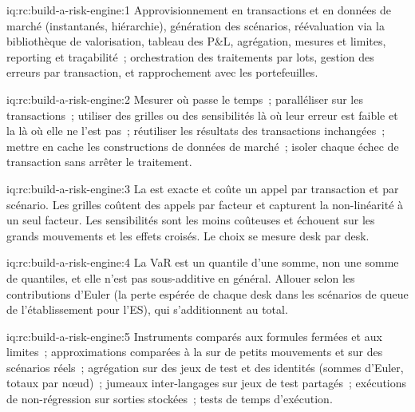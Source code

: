 \begin{solution}{iq:rc:build-a-risk-engine:1}
Approvisionnement en transactions et en données de marché (instantanés, hiérarchie), génération des scénarios, réévaluation via la
bibliothèque de valorisation, tableau des P\&L, agrégation, mesures et limites, reporting et traçabilité~; orchestration des traitements par lots,
gestion des erreurs par transaction, et rapprochement avec les portefeuilles.
\end{solution}

\begin{solution}{iq:rc:build-a-risk-engine:2}
Mesurer où passe le temps~; paralléliser sur les transactions~; utiliser des grilles ou des sensibilités là où leur erreur est faible
et la  là où elle ne l'est pas~; réutiliser les résultats des transactions inchangées~; mettre en cache les constructions de données de marché~; isoler chaque
échec de transaction sans arrêter le traitement.
\end{solution}

\begin{solution}{iq:rc:build-a-risk-engine:3}
La  est exacte et coûte un appel par transaction et par scénario. Les grilles coûtent des appels par facteur et capturent
la non-linéarité à un seul facteur. Les sensibilités sont les moins coûteuses et échouent sur les grands mouvements et les effets croisés. Le choix
se mesure desk par desk.
\end{solution}

\begin{solution}{iq:rc:build-a-risk-engine:4}
La VaR est un quantile d'une somme, non une somme de quantiles, et elle n'est pas sous-additive en général. Allouer selon les
contributions d'Euler (la perte espérée de chaque desk dans les scénarios de queue de l'établissement pour l'ES), qui s'additionnent au total.
\end{solution}

\begin{solution}{iq:rc:build-a-risk-engine:5}
Instruments comparés aux formules fermées et aux limites~; approximations comparées à la  sur de petits mouvements et sur
des scénarios réels~; agrégation sur des jeux de test et des identités (sommes d'Euler, totaux par nœud)~; jumeaux inter-langages sur
jeux de test partagés~; exécutions de non-régression sur sorties stockées~; tests de temps d'exécution.
\end{solution}

